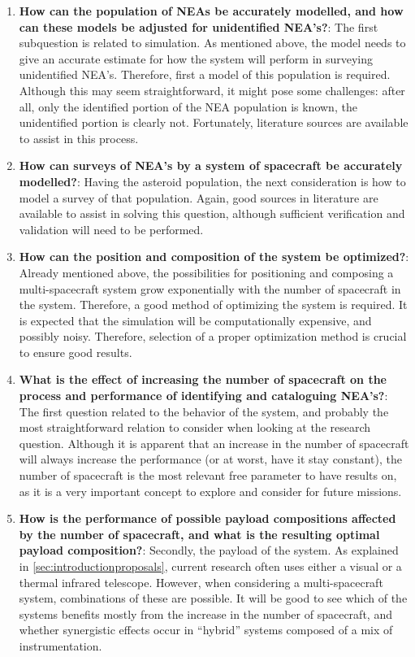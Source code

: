 \begin{enumerate}
 \item \textbf{How can the population of NEAs be accurately modelled, and how can these models be adjusted for unidentified NEA's?}: The first subquestion is related to simulation. As mentioned above, the model needs to give an accurate estimate for how the system will perform in surveying unidentified NEA's. Therefore, first a model of this population is required. Although this may seem straightforward, it might pose some challenges: after all, only the identified portion of the NEA population is known, the unidentified portion is clearly not. Fortunately, literature sources are available to assist in this process.
 \item \textbf{How can surveys of NEA's by a system of spacecraft be accurately modelled?}: Having the asteroid population, the next consideration is how to model a survey of that population. Again, good sources in literature are available to assist in solving this question, although sufficient verification and validation will need to be performed.
 \item \textbf{How can the position and composition of the system be optimized?}: Already mentioned above, the possibilities for positioning and composing a multi-spacecraft system grow exponentially with the number of spacecraft in the system. Therefore, a good method of optimizing the system is required. It is expected that the simulation will be computationally expensive, and possibly noisy. Therefore, selection of a proper optimization method is crucial to ensure good results.
 \item \textbf{What is the effect of increasing the number of spacecraft on the process and performance of identifying and cataloguing NEA's?}: The first question related to the behavior of the system, and probably the most straightforward relation to consider when looking at the research question. Although it is apparent that an increase in the number of spacecraft will always increase the performance (or at worst, have it stay constant), the number of spacecraft is the most relevant free parameter to have results on, as it is a very important concept to explore and consider for future missions.
 \item \textbf{How is the performance of possible payload compositions affected by the number of spacecraft, and what is the resulting optimal payload composition?}: Secondly, the payload of the system. As explained in \autoref{sec:introductionproposals}, current research often uses either a visual or a thermal infrared telescope. However, when considering a multi-spacecraft system, combinations of these are possible. It will be good to see which of the systems benefits mostly from the increase in the number of spacecraft, and whether synergistic effects occur in ``hybrid'' systems composed of a mix of instrumentation. 

\end{enumerate}
